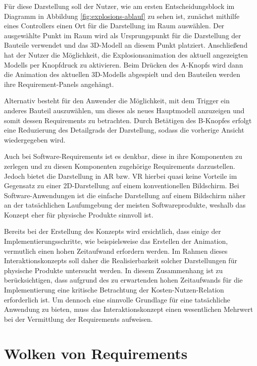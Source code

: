 Für diese Darstellung soll der Nutzer, wie am ersten Entscheidungsblock im Diagramm in Abbildung \ref{fig:explosions-ablauf} zu sehen ist, zunächst mithilfe eines Controllers einen Ort für die Darstellung im Raum auswählen.
Der ausgewählte Punkt im Raum wird als Ursprungspunkt für die Darstellung der Bauteile verwendet und das 3D-Modell an diesem Punkt platziert.
Anschließend hat der Nutzer die Möglichkeit, die Explosionsanimation des aktuell angezeigten Modells per Knopfdruck zu aktivieren.
Beim Drücken des A-Knopfs wird dann die Animation des aktuellen 3D-Modells abgespielt und den Bauteilen werden ihre Requirement-Panels angehängt.

Alternativ besteht für den Anwender die Möglichkeit, mit dem Trigger ein anderes Bauteil auszuwählen, um dieses als neues Hauptmodell anzuzeigen und somit dessen Requirements zu betrachten.
Durch Betätigen des B-Knopfes erfolgt eine Reduzierung des Detailgrads der Darstellung, sodass die vorherige Ansicht wiedergegeben wird.

Auch bei Software-Requirements ist es denkbar, diese in ihre Komponenten zu zerlegen und zu diesen Komponenten zugehörige Requirements darzustellen.
Jedoch bietet die Darstellung in AR bzw. VR hierbei quasi keine Vorteile im Gegensatz zu einer 2D-Darstellung auf einem konventionellen Bildschirm.
Bei Software-Anwendungen ist die einfache Darstellung auf einem Bildschirm näher an der tatsächlichen Laufumgebung der meisten Softwareprodukte, weshalb das Konzept eher für physische Produkte sinnvoll ist.

Bereits bei der Erstellung des Konzepts wird ersichtlich, dass einige der Implementierungsschritte, wie beispielsweise das Erstellen der Animation, vermutlich einen hohen Zeitaufwand erfordern werden.
Im Rahmen dieses Interaktionskonzepts soll daher die Realisierbarkeit solcher Darstellungen für physische Produkte untersucht werden.
In diesem Zusammenhang ist zu berücksichtigen, dass aufgrund des zu erwartenden hohen Zeitaufwands für die Implementierung eine kritische Betrachtung der Kosten-Nutzen-Relation erforderlich ist.
Um dennoch eine sinnvolle Grundlage für eine tatsächliche Anwendung zu bieten, muss das Interaktionskonzept einen wesentlichen Mehrwert bei der Vermittlung der Requirements aufweisen.

\newpage
\section{Wolken von Requirements}


